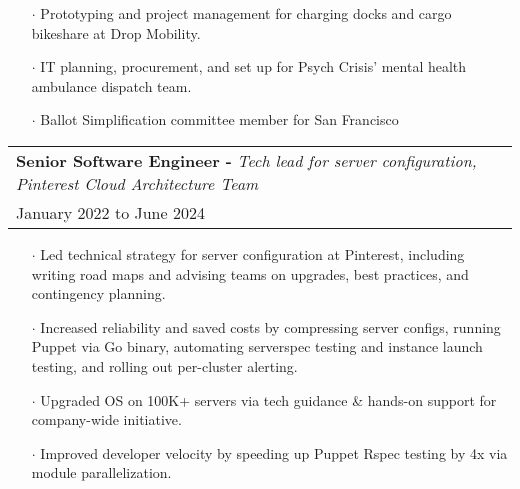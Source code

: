 \documentclass[letterpaper, oneside, final]{scrartcl} %
\begin{document}
\begin{center}
\begin{itemize}
\item[$\cdot$] Prototyping and project management for charging docks and cargo bikeshare at Drop Mobility.\\[10pt]
\item[$\cdot$] IT planning, procurement, and set up for Psych Crisis' mental health ambulance dispatch team.\\[10pt]
\item[$\cdot$] Ballot Simplification committee member for San Francisco\\[10pt]
\end{itemize}

\begingroup\setlength{\fboxsep}{0pt}
\colorbox{mygray}{
\begin{flushleft}
\begin{tabularx}{\textwidth}{l}
\textbf{Senior Software Engineer -} \textit{Tech lead for server configuration, Pinterest Cloud Architecture Team}\\
January 2022 to June 2024\\
\end{tabularx}
\end{flushleft}
}\endgroup
\vspace{-0.1cm}
\begin{itemize} \itemsep-0.2cm


\item[$\cdot$] Led technical strategy for server configuration at Pinterest, including writing road maps and advising teams on upgrades, best practices, and contingency planning.\\[10pt]
\item[$\cdot$] Increased reliability and saved costs by compressing server configs, running Puppet via Go binary, automating serverspec testing and instance launch testing, and rolling out per-cluster alerting.\\[10pt]
\item[$\cdot$] Upgraded OS on 100K+ servers via tech guidance \& hands-on support for company-wide initiative.\\[10pt]
\item[$\cdot$] Improved developer velocity by speeding up Puppet Rspec testing by 4x via module parallelization.\\[10pt]


\end{itemize}



\end{center}
\end{document}
